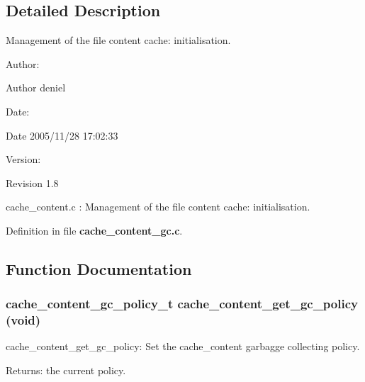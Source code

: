 \subsection{Detailed Description}
Management of the file content cache: initialisation. 

\begin{Desc}
\item[Author:]\end{Desc}
\begin{Desc}
\item[Author]deniel \end{Desc}
\begin{Desc}
\item[Date:]\end{Desc}
\begin{Desc}
\item[Date]2005/11/28 17:02:33 \end{Desc}
\begin{Desc}
\item[Version:]\end{Desc}
\begin{Desc}
\item[Revision]1.8 \end{Desc}
cache\_\-content.c : Management of the file content cache: initialisation. 

Definition in file {\bf cache\_\-content\_\-gc.c}.

\subsection{Function Documentation}
\subsubsection[{cache\_\-content\_\-get\_\-gc\_\-policy}]{\setlength{\rightskip}{0pt plus 5cm}cache\_\-content\_\-gc\_\-policy\_\-t cache\_\-content\_\-get\_\-gc\_\-policy (void)}\label{cache__content__gc_8c_761ce95340e3527adfdf381d3651abd3}


cache\_\-content\_\-get\_\-gc\_\-policy: Set the cache\_\-content garbagge collecting policy.

\begin{Desc}
\item[Returns:]the current policy. \end{Desc}


